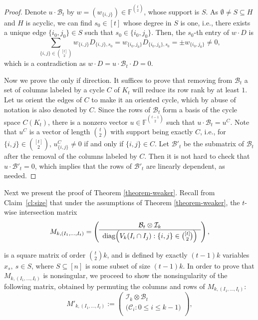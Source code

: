 \documentclass[11pt]{article}
\newcommand\black[1]{{\color{black} #1}}
\newcommand{\ma}{\mathcal}
\begin{document}
\begin{proof}
Denote $u\cdot \mathcal{B}_t$ by $w=(w_{\{i,j\}})\in\mathbb{F}^{\binom{t}{2}}$, whose support is $S$.
As  $\emptyset\neq S\subseteq H$ and $H$ is acyclic, we can find $s_0\in [t]$ whose degree in $S$ is one, i.e., there exists a unique edge $\{i_0,j_0\}\in S$ such that $s_0\in \{i_0,j_0\}$. Then, the $s_0$-th entry of $w\cdot D$ is
\[
\sum_{\{i,j\}\in \binom{[t]}{2}} w_{\{i,j\}} D_{\{i,j\},s_0} = w_{\{i_0,j_0\}} D_{\{i_0,j_0\},s_0}=\pm  w_{\{i_0,j_0\}}\neq 0,
\]
which is a contradiction as $w\cdot D= u\cdot \mathcal{B}_t\cdot D=0$.

Now we prove the only if direction.
It suffices to prove that removing from $\mathcal{B}_t$ a set of columns labeled by a cycle $C$ of $K_t$ will reduce its row rank by at least $1$. Let us orient the edges of $C$ to make it an oriented cycle, which by abuse of notation is also denoted by $C$.
Since the rows of $\mathcal{B}_t$ form a basis of \black{the cycle space} $C(K_t)$, there is a nonzero vector $u\in\mathbb{F}^{\binom{t-1}{2}}$ such that $u\cdot\mathcal{B}_t=u^C$. \black{Note that $u^C$ is a vector of length $\binom{t}{2}$ with support being exactly $C$, i.e., for $\{i,j\}\in\binom{[t]}{2}$, $u^C_{\{i,j\}}\neq 0$ if and only if $\{i,j\}\in C$.} Let $\mathcal{B}'_t$ be the submatrix of $\mathcal{B}_t$ after the removal of the columns labeled by $C$. Then it is not hard to check that $u\cdot\mathcal{B}'_t=0$, which implies that the rows of $\mathcal{B}'_t$ are linearly dependent, as needed.
\end{proof}


Next we present the proof of Theorem \ref{theorem-weaker}. Recall from Claim~\ref{cl:size}
 that under the assumptions of Theorem \ref{theorem-weaker}, the $t$-wise intersection matrix
\begin{equation*}\label{int-matrix-2}
M_{k,(I_1,\ldots,I_t)}=\left(
  \begin{array}{c}
    \mathcal{B}_t\otimes \mathcal{I}_k  \\\hline

  {\rm diag}\Big(V_k(I_i\cap I_{j}): \{i,j\}\in \binom{[t]}{2}\Big) \\
  \end{array}
\right),
\end{equation*}

\noindent is a square matrix of order $\binom{t}{2}k$, and is defined by exactly $(t-1)k$ variables $x_s,~s\in S$, where $S\subseteq[n]$ is some subset of size $(t-1)k$. In order to prove that $M_{k,(I_1,\ldots,I_t)}$ is nonsingular, we proceed to show the nonsingularity of the following matrix, obtained by permuting the columns and rows of $M_{k,(I_1,\ldots,I_t)}$:
\begin{equation*}
M'_{k,(I_1,\ldots,I_t)}:=\left(
  \begin{array}{c}
    \mathcal{I}_k\otimes \mathcal{B}_t  \\\hline

  \big(\ma{C}_i:0\le i\le k-1\big) \\
  \end{array}
\right),
\end{equation*}
\end{document}
